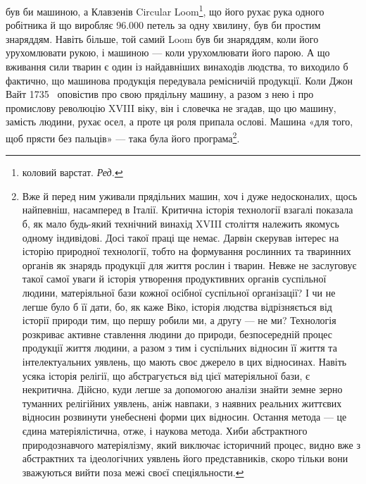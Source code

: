\parcont{}  %
був би машиною, а Клавзенів Circular Loom\footnote*{
коловий варстат. \emph{Ред.}
}, що його рухає
рука одного робітника й що виробляє \num{96.000} петель за одну хвилину,
був би простим знаряддям. Навіть більше, той самий Loom
був би знаряддям, коли його урухомлювати рукою, і машиною —
коли урухомлювати його парою. А що вживання сили тварин є
один із найдавніших винаходів людства, то виходило б фактично,
що машинова продукція передувала ремісничій продукції. Коли
Джон Вайт 1735~ оповістив про свою прядільну машину, а
разом з нею і про промислову революцію XVIII віку, він і словечка
не згадав, що цю машину, замість людини, рухає осел, а
проте ця роля припала ослові. Машина «для того, щоб прясти
без пальців» — така була його програма\footnote{
Вже й перед ним уживали прядільних машин, хоч і дуже недосконалих,
щось найпевніш, насамперед в Італії. Критична історія технології
взагалі показала б, як мало будь-який технічний винахід XVIII століття
належить якомусь одному індивідові. Досі такої праці ще немає. Дарвін
скерував інтерес на історію природної технології, тобто на формування
рослинних та тваринних органів як знарядь продукції для життя рослин і
тварин. Невже не заслуговує такої самої уваги й історія утворення
продуктивних органів суспільної людини, матеріяльної бази кожної
осібної суспільної організації? І чи не легше було б її дати, бо, як каже
Віко, історія людства відрізняється від історії природи тим, що першу
робили ми, а другу — не ми? Технологія розкриває активне ставлення
людини до природи, безпосередній процес продукції життя людини, а
разом з тим і суспільних відносин її життя та інтелектуальних уявлень,
що мають своє джерело в цих відносинах. Навіть усяка історія релігії,
що абстрагується від цієї матеріяльної бази, є некритична. Дійсно,
куди легше за допомогою аналізи знайти земне зерно туманних релігійних
уявлень, аніж навпаки, з наявних реальних життєвих відносин розвинути
унебеснені форми цих відносин. Остання метода — це єдина матеріялістична,
отже, і наукова метода. Хиби абстрактного природознавчого
матеріялізму, який виключає історичний процес, видно вже з абстрактних
та ідеологічних уявлень його представників, скоро тільки вони зважуються
вийти поза межі своєї спеціяльности.
}.

